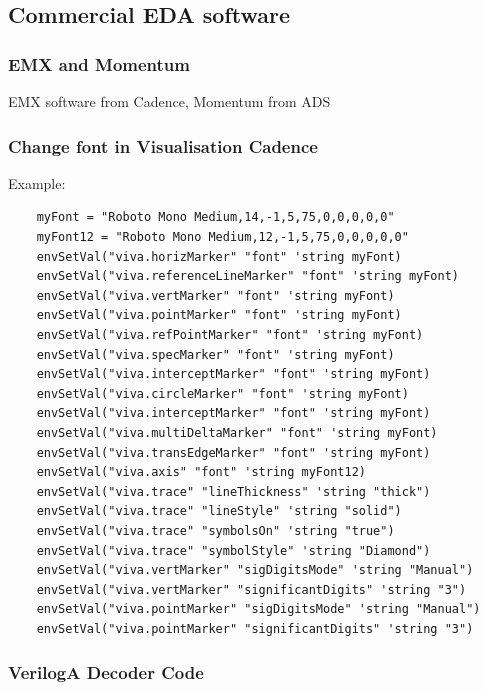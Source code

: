\subsection{Commercial EDA software}

\subsubsection*{EMX and Momentum}
EMX software from Cadence, Momentum from ADS

\newpage

\subsubsection{Change font in Visualisation Cadence}

Example:

\begin{verbatim}
	myFont = "Roboto Mono Medium,14,-1,5,75,0,0,0,0,0"
	myFont12 = "Roboto Mono Medium,12,-1,5,75,0,0,0,0,0"
	envSetVal("viva.horizMarker" "font" 'string myFont)
	envSetVal("viva.referenceLineMarker" "font" 'string myFont)
	envSetVal("viva.vertMarker" "font" 'string myFont)
	envSetVal("viva.pointMarker" "font" 'string myFont)
	envSetVal("viva.refPointMarker" "font" 'string myFont)
	envSetVal("viva.specMarker" "font" 'string myFont)
	envSetVal("viva.interceptMarker" "font" 'string myFont)
	envSetVal("viva.circleMarker" "font" 'string myFont)
	envSetVal("viva.interceptMarker" "font" 'string myFont)
	envSetVal("viva.multiDeltaMarker" "font" 'string myFont)
	envSetVal("viva.transEdgeMarker" "font" 'string myFont)
	envSetVal("viva.axis" "font" 'string myFont12)
	envSetVal("viva.trace" "lineThickness" 'string "thick")
	envSetVal("viva.trace" "lineStyle" 'string "solid")
	envSetVal("viva.trace" "symbolsOn" 'string "true")
	envSetVal("viva.trace" "symbolStyle" 'string "Diamond")
	envSetVal("viva.vertMarker" "sigDigitsMode" 'string "Manual")
	envSetVal("viva.vertMarker" "significantDigits" 'string "3")
	envSetVal("viva.pointMarker" "sigDigitsMode" 'string "Manual")
	envSetVal("viva.pointMarker" "significantDigits" 'string "3")
\end{verbatim}


\subsubsection{VerilogA Decoder Code}

